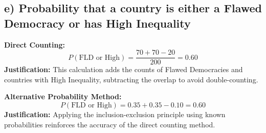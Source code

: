 \documentclass{article}
\begin{document}
\subsection*{e) Probability that a country is either a Flawed Democracy or has High Inequality}
\textbf{Direct Counting:}
\[ P(\text{FLD or High}) = \frac{70 + 70 - 20}{200} = 0.60 \]
\textbf{Justification:} This calculation adds the counts of Flawed Democracies and countries with High Inequality, subtracting the overlap to avoid double-counting.

\textbf{Alternative Probability Method:}
\[ P(\text{FLD or High}) = 0.35 + 0.35 - 0.10 = 0.60 \]
\textbf{Justification:} Applying the inclusion-exclusion principle using known probabilities reinforces the accuracy of the direct counting method.
\end{document}
